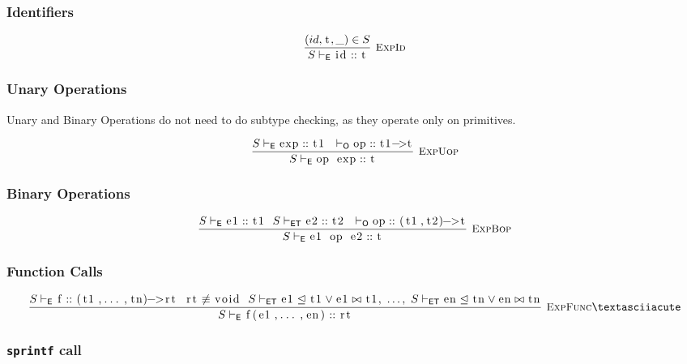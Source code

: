 \documentclass{article}
\newcommand{\code}[1]{\lstinline[columns=fixed]{#1}}
\newcommand{\drmrule}[5]{\frac{#1}{#2\vdash_{\mathsf{#3}}#4}\textsc{\ \small{#5}}}
\newcommand{\ruleapp}[1]{\vdash_{\mathsf{#1}}}
\newcommand{\mc}[1]{\textnormal{\code{#1}}}
\begin{document}
			\subsubsection{Identifiers}
			
				\begin{align*}
					\drmrule{(id,\mc{t},\_)\in S}{S}{E}{\mc{id} :: \mc{t}}{ExpId}
				\end{align*}
			
			\subsubsection{Unary Operations}
			
				Unary and Binary Operations do not need to do subtype checking, as they operate only on primitives.
			
				\begin{align*}
					\drmrule{S\ruleapp{E}\mc{exp}::\mc{t1}\ \ \ruleapp{O}\mc{op}::\mc{t1->t}}{S}{E}{\mc{op exp}::\mc{t}}{ExpUop}
				\end{align*}
			
			\subsubsection{Binary Operations}
			
				\begin{align*}
					\drmrule{S\ruleapp{E}\mc{e1}::\mc{t1}\ \ S\ruleapp{ET}\mc{e2}::\mc{t2}\ \ \ruleapp{O}\mc{op}::\mc{(t1,t2)->t}}{S}{E}{\mc{e1 op e2} :: \mc{t}}{ExpBop}
				\end{align*}
			
			\subsubsection{Function Calls}
			
				\begin{align*}
					\drmrule{S\ruleapp{E}\mc{f}::\mc{(t1,...,tn)->rt}\ \ \mc{rt}\not\equiv\mc{void}\ \  S\ruleapp{ET}\mc{e1}\trianglelefteq\mc{t1}\vee\mc{e1}\bowtie\mc{t1},\ \dots,\ S\ruleapp{ET}\mc{en}\trianglelefteq\mc{tn}\vee\mc{en}\bowtie\mc{tn}}{S}{E}{\mc{f(e1,...,en)}::\mc{rt}}{ExpFunc}´
				\end{align*}
				
			\subsubsection{\code{sprintf} call}
			
\end{document}

